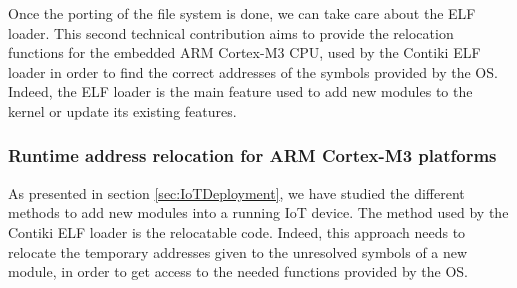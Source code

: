 	

Once the porting of the file system is done, we can take care about the ELF loader.
This second technical contribution aims to provide the relocation functions for the embedded ARM Cortex-M3 CPU, used by the Contiki ELF loader in order to find the correct addresses of the symbols provided by the OS.
Indeed, the ELF loader is the main feature used to add new modules to the kernel or update its existing features.

\subsubsection{Runtime address relocation for ARM Cortex-M3 platforms}
As presented in section \ref{sec:IoTDeployment}, we have studied the different methods to add new modules into a running IoT device.
The method used by the Contiki ELF loader is the relocatable code.
Indeed, this approach needs to relocate the temporary addresses given to the unresolved symbols of a new module, in order to get access to the needed functions provided by the OS.

